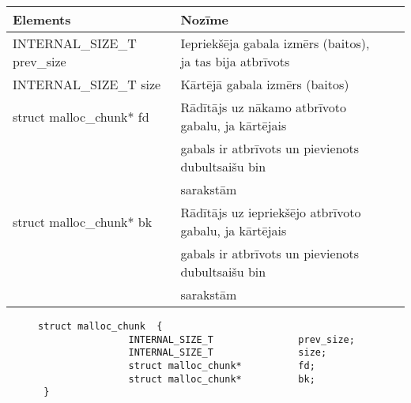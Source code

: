 \begin{table}[H]
\caption{\textbf{\fontsize{11}{12}\selectfont {\\ Chunk struktūras elementu apraksts}}} 
\label{table:kysymys}
\centering
	\begin{tabular}{|l|l|r|p{5cm}|}
	  \hline
	Elements & Nozīme \\
	\hline
	  INTERNAL\_SIZE\_T               prev\_size & Iepriekšēja gabala izmērs (baitos), ja tas bija atbrīvots\\
      \hline
      INTERNAL\_SIZE\_T               size & Kārtējā gabala izmērs (baitos) \\
      \hline
      struct malloc\_chunk*          fd & Rādītājs uz nākamo atbrīvoto gabalu, ja kārtējais  \\
                                                     & gabals ir atbrīvots un pievienots dubultsaišu bin \\
                                                     & sarakstām\\
      \hline
      struct malloc\_chunk*          bk & Rādītājs uz iepriekšējo atbrīvoto gabalu, ja kārtējais  \\
                                                     & gabals ir atbrīvots un pievienots dubultsaišu bin \\
                                                     & sarakstām\\
    \hline
	\end{tabular}
\end{table}
\begin{figure}[h]
\begin{lstlisting}
struct malloc_chunk  {
                INTERNAL_SIZE_T               prev_size;
                INTERNAL_SIZE_T               size;
                struct malloc_chunk*          fd;
                struct malloc_chunk*          bk;
 }
\end{lstlisting}
\caption{\textbf{\fontsize{11}{12}\selectfont {Atmiņas gabala struktūra}}}
\end{figure}

